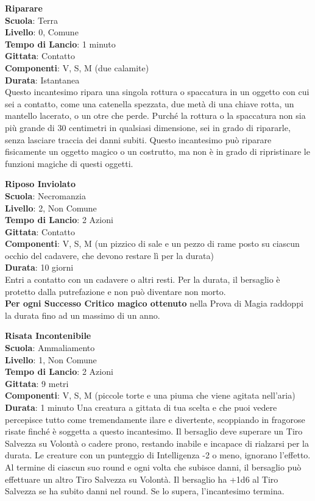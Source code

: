 \begin{multicols}{2}
\medskip\textbf{Riparare}\\
\textbf{Scuola}: Terra\\
\textbf{Livello}: 0, Comune\\
\textbf{Tempo di Lancio}: 1 minuto\\
\textbf{Gittata}: Contatto\\
\textbf{Componenti}: V, S, M (due calamite)\\
\textbf{Durata}: Istantanea\\
Questo incantesimo ripara una singola rottura o spaccatura in un oggetto con cui sei a contatto, come una catenella spezzata, due metà di una chiave rotta, un mantello lacerato, o un otre che perde. Purché la rottura o la spaccatura non sia più grande di 30 centimetri in qualsiasi dimensione, sei in grado di ripararle, senza lasciare traccia dei danni subiti. Questo incantesimo può riparare fisicamente un oggetto magico o un costrutto, ma non è in grado di ripristinare le funzioni magiche di questi oggetti.

\medskip\textbf{Riposo Inviolato}\\
\textbf{Scuola}: Necromanzia\\
\textbf{Livello}: 2, Non Comune\\
\textbf{Tempo di Lancio}: 2 Azioni\\
\textbf{Gittata}: Contatto\\
\textbf{Componenti}: V, S, M (un pizzico di sale e un pezzo di rame posto su ciascun occhio del cadavere, che devono restare lì per la durata)\\
\textbf{Durata}: 10 giorni\\
Entri a contatto con un cadavere o altri resti. Per la durata, il bersaglio è protetto dalla putrefazione e non può diventare non morto. \\
\textbf{Per ogni Successo Critico magico ottenuto} nella Prova di Magia raddoppi la durata fino ad un massimo di un anno.

\medskip\textbf{Risata Incontenibile}\\
\textbf{Scuola}: Ammaliamento\\
\textbf{Livello}: 1, Non Comune\\
\textbf{Tempo di Lancio}: 2 Azioni\\
\textbf{Gittata}: 9 metri\\
\textbf{Componenti}: V, S, M (piccole torte e una piuma che viene agitata nell'aria)\\
\textbf{Durata}: 1 minuto
Una creatura a gittata di tua scelta e che puoi vedere percepisce tutto come tremendamente ilare e divertente, scoppiando in fragorose risate finché è soggetta a questo incantesimo. Il bersaglio deve superare un Tiro Salvezza su Volontà o cadere prono, restando inabile e incapace di rialzarsi per la durata. Le creature con un punteggio di Intelligenza -2 o meno, ignorano l'effetto.\\
Al termine di ciascun suo round e ogni volta che subisce danni, il bersaglio può effettuare un altro Tiro Salvezza su Volontà. Il bersaglio ha +1d6 al Tiro Salvezza se ha subito danni nel round. Se lo supera, l'incantesimo termina.


\end{multicols}
